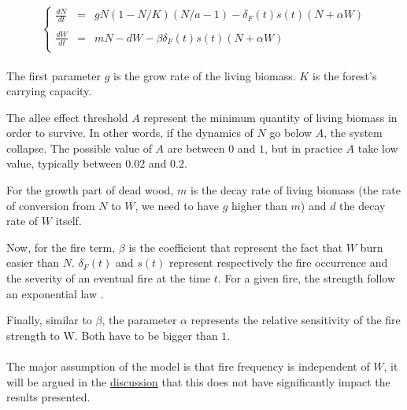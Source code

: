 \documentclass{article}
\begin{document}
\paragraph{}

\[
\left\lbrace
\begin{array}{rcl}
\frac{dN}{dt} & = & gN(1-N/K)(N/a-1) - \delta_F(t)s(t)(N+\alpha W) \\
\\
\frac{dW}{dt} & = & mN -dW - \beta\delta_F(t)s(t)(N+\alpha W) \\
\end{array}
\right.
\]


\paragraph{} %
The first parameter $g$ is the grow rate of the living biomass. $K$ is the forest's carrying capacity. 

The allee effect threshold $A$ represent the minimum quantity of living biomass in order to survive. In other words, if the dynamics of $N$ go below $A$, the system collapse. The possible value of $A$ are between $0$ and $1$, but in practice $A$ take low value, typically between $0.02$ and $0.2$.

For the growth part of dead wood, $m$ is the decay rate of living biomass (the rate of conversion from $N$ to $W$, we need to have $g$ higher than $m$) and $d$ the decay rate of $W$ itself. 

Now, for the fire term, $\beta$ is the coefficient that represent the fact that $W$ burn easier than $N$. $\delta_F(t)$ and $s(t)$ represent respectively the fire occurrence and the severity of an eventual fire at the time $t$. For a given fire, the strength follow an exponential law \citep{gauthier_les_2001, cyr_forest_2009}.

Finally, similar to $\beta$, the parameter $\alpha$ represents the relative sensitivity of the fire strength to W. Both have to be bigger than $1$.




\paragraph{} %
The major assumption of the model is that fire frequency is independent of $W$, it will be argued in the \hyperref[discussion_frequency_ass]{discussion} that this does not have significantly impact the results presented.
\end{document}
